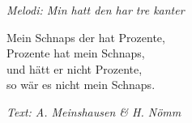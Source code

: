 {\footnotesize\textit{Melodi: Min hatt den har tre kanter}}\par
\vspace{10pt}
Mein Schnaps der hat Prozente,\\
Prozente hat mein Schnaps,\\
und hätt er nicht Prozente,\\
so wär es nicht mein Schnaps.
\par
\vspace{10pt}
{\footnotesize\textit{Text: A. Meinshausen \& H. Nömm}}
